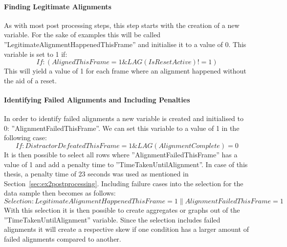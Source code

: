 \paragraph{Finding Legitimate Alignments}
As with most post processing steps, this step starts with the creation of a new variable. For the sake of examples this will be called ''LegitimateAlignmentHappenedThisFrame'' and initialise it to a value of 0. This variable is set to 1 if:
$$
If: (AlignedThisFrame = 1 \& LAG(IsResetActive) != 1)
$$
This will yield a value of 1 for each frame where an alignment happened without the aid of a reset. 

\paragraph{Identifying Failed Alignments and Including Penalties}
In order to identify failed alignments a new variable is created and initialised to 0: ''AlignmentFailedThisFrame''. We can set this variable to a value of 1 in the following case:
$$
If: DistractorDefeatedThisFrame = 1 \& LAG(AlignmentComplete) = 0
$$
It is then possible to select all rows where ''AlignmentFailedThisFrame'' has a value of 1 and add a penalty time to ''TimeTakenUntilAlignment''. In case of this thesis, a penalty time of 23 seconds was used as mentioned in Section~\ref{sec:ex2postprocessing}. Including failure cases into the selection for the data sample then becomes as follows:
$$
Selection: LegitimateAlignmentHappenedThisFrame = 1 \| AlignmentFailedThisFrame = 1
$$
With this selection it is then possible to create aggregates or graphs out of the ''TimeTakenUntilAlignment'' variable. Since the selection includes failed alignments it will create a respective skew if one condition has a larger amount of failed alignments compared to another. 